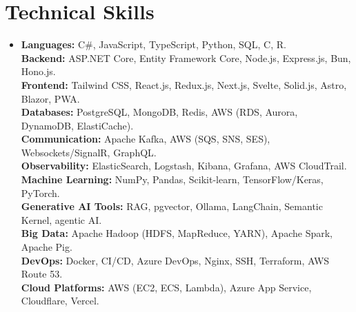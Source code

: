 \documentclass[12pt,a4paper]{article}
\begin{document}
\section{Technical Skills}
 \begin{itemize}[leftmargin=0in, label={}]
    \item {
        \textbf{Languages:} C\#, JavaScript, TypeScript, Python, SQL, C, R.\\
        \textbf{Backend:} ASP.NET Core, Entity Framework Core, Node.js, Express.js, Bun, Hono.js.\\
        \textbf{Frontend:} Tailwind CSS, React.js, Redux.js, Next.js, Svelte, Solid.js, Astro, Blazor, PWA.\\
        \textbf{Databases:} PostgreSQL, MongoDB, Redis, AWS (RDS, Aurora, DynamoDB, ElastiCache).\\
        \textbf{Communication:} Apache Kafka, AWS (SQS, SNS, SES), Websockets/SignalR, GraphQL.\\
        \textbf{Observability:} ElasticSearch, Logstash, Kibana, Grafana, AWS CloudTrail.\\
        \textbf{Machine Learning:} NumPy, Pandas, Scikit-learn, TensorFlow/Keras, PyTorch.\\
        \textbf{Generative AI Tools:} RAG, pgvector, Ollama, LangChain, Semantic Kernel, agentic AI.\\
        \textbf{Big Data:} Apache Hadoop (HDFS, MapReduce, YARN), Apache Spark, Apache Pig.\\
        \textbf{DevOps:} Docker, CI/CD, Azure DevOps, Nginx, SSH, Terraform, AWS Route 53.\\
        \textbf{Cloud Platforms:} AWS (EC2, ECS, Lambda), Azure App Service, Cloudflare, Vercel.
    }
 \end{itemize}
 
\end{document}
